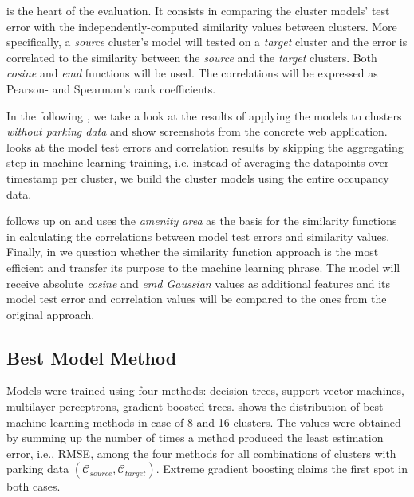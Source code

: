  is the heart of the evaluation. It consists in comparing the cluster models' test error with the independently-computed similarity values between clusters. More specifically, a \textit{source} cluster's model will tested on a \textit{target} cluster and the error is correlated to the similarity between the \textit{source} and the \textit{target} clusters. Both \textit{cosine} and \textit{emd} functions will be used. The correlations will be expressed as Pearson- and Spearman's rank coefficients.

In the following , we take a look at the results of applying the models to clusters \textit{without parking data} and show screenshots from the concrete web application.  looks at the model test errors and correlation results by skipping the aggregating step in machine learning training, i.e. instead of averaging the datapoints over timestamp per cluster, we build the cluster models using the entire occupancy data. 

 follows up on  and uses the \textit{amenity area} as the basis for the similarity functions in calculating the correlations between model test errors and similarity values. Finally, in  we question whether the similarity function approach is the most efficient and transfer its purpose to the machine learning phrase. The model will receive absolute \textit{cosine} and \textit{emd Gaussian} values as additional features and its model test error and correlation values will be compared to the ones from the original approach.

\subsection{Best Model Method}
\label{evaluation:best_model}
Models were trained using four methods: decision trees, support vector machines, multilayer perceptrons, gradient boosted trees.  shows the distribution of best machine learning methods in case of 8 and 16 clusters.
The values were obtained by summing up the number of times a method produced the least estimation error, i.e., RMSE, among the four methods for all combinations of clusters with parking data $(\mathcal{C}_{source}, \mathcal{C}_{target})$.
Extreme gradient boosting claims the first spot in both cases.

